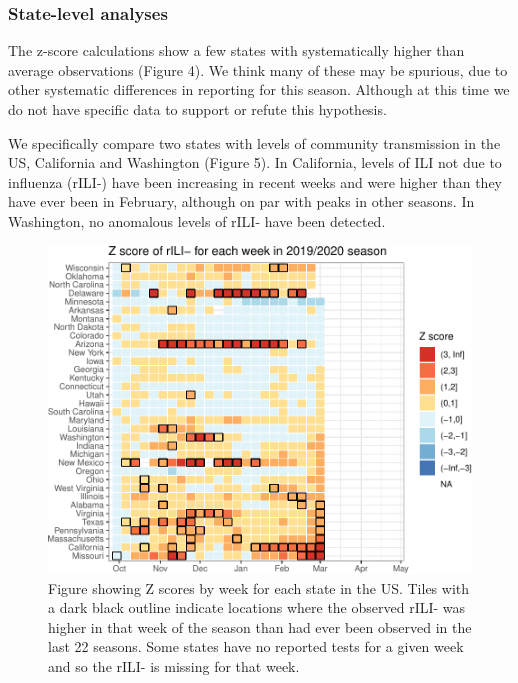 \documentclass[]{article}
\begin{document}
\hypertarget{state-level-analyses}{%
\subsubsection{State-level analyses}\label{state-level-analyses}}

The z-score calculations show a few states with systematically higher
than average observations (Figure 4). We think many of these may be
spurious, due to other systematic differences in reporting for this
season. Although at this time we do not have specific data to support or
refute this hypothesis.

We specifically compare two states with levels of community transmission
in the US, California and Washington (Figure 5). In California, levels
of ILI not due to influenza (rILI-) have been increasing in recent weeks
and were higher than they have ever been in February, although on par
with peaks in other seasons. In Washington, no anomalous levels of rILI-
have been detected.

\begin{figure}
\centering
\includegraphics{ili-labtest-report_files/figure-latex/calc-avg-sd-all-states-1.pdf}
\caption{Figure showing Z scores by week for each state in the US. Tiles
with a dark black outline indicate locations where the observed rILI-
was higher in that week of the season than had ever been observed in the
last 22 seasons. Some states have no reported tests for a given week and
so the rILI- is missing for that week.}
\end{figure}
\end{document}
